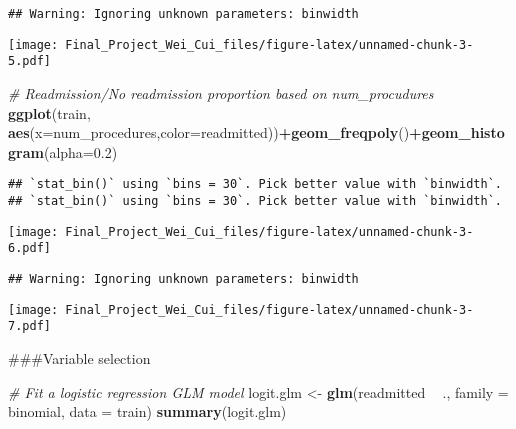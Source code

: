 \documentclass[
]{article}
\newenvironment{Shaded}{\begin{snugshade}}{\end{snugshade}}
\newcommand{\CommentTok}[1]{\textcolor[rgb]{0.56,0.35,0.01}{\textit{#1}}}
\newcommand{\DataTypeTok}[1]{\textcolor[rgb]{0.13,0.29,0.53}{#1}}
\newcommand{\DecValTok}[1]{\textcolor[rgb]{0.00,0.00,0.81}{#1}}
\newcommand{\FloatTok}[1]{\textcolor[rgb]{0.00,0.00,0.81}{#1}}
\newcommand{\KeywordTok}[1]{\textcolor[rgb]{0.13,0.29,0.53}{\textbf{#1}}}
\newcommand{\NormalTok}[1]{#1}
\newcommand{\OperatorTok}[1]{\textcolor[rgb]{0.81,0.36,0.00}{\textbf{#1}}}
\newcommand{\StringTok}[1]{\textcolor[rgb]{0.31,0.60,0.02}{#1}}
\begin{document}
\begin{verbatim}
## Warning: Ignoring unknown parameters: binwidth
\end{verbatim}

\texttt{[image: Final\_Project\_Wei\_Cui\_files/figure-latex/unnamed-chunk-3-5.pdf]}

\begin{Shaded}
\begin{Highlighting}[]
\CommentTok{# Readmission/No readmission proportion based on num_procudures}
\KeywordTok{ggplot}\NormalTok{(train, }\KeywordTok{aes}\NormalTok{(}\DataTypeTok{x=}\NormalTok{num_procedures,}\DataTypeTok{color=}\NormalTok{readmitted))}\OperatorTok{+}\KeywordTok{geom_freqpoly}\NormalTok{()}\OperatorTok{+}\KeywordTok{geom_histogram}\NormalTok{(}\DataTypeTok{alpha=}\FloatTok{0.2}\NormalTok{)}
\end{Highlighting}
\end{Shaded}

\begin{verbatim}
## `stat_bin()` using `bins = 30`. Pick better value with `binwidth`.
## `stat_bin()` using `bins = 30`. Pick better value with `binwidth`.
\end{verbatim}

\texttt{[image: Final\_Project\_Wei\_Cui\_files/figure-latex/unnamed-chunk-3-6.pdf]}

\begin{Shaded}
\end{Shaded}

\begin{verbatim}
## Warning: Ignoring unknown parameters: binwidth
\end{verbatim}

\texttt{[image: Final\_Project\_Wei\_Cui\_files/figure-latex/unnamed-chunk-3-7.pdf]}

\#\#\#Variable selection

\begin{Shaded}
\begin{Highlighting}[]
\CommentTok{# Fit a logistic regression GLM model}
\NormalTok{logit.glm <-}\StringTok{ }\KeywordTok{glm}\NormalTok{(readmitted }\OperatorTok{~}\StringTok{ }\NormalTok{., }\DataTypeTok{family =}\NormalTok{ binomial, }\DataTypeTok{data =}\NormalTok{ train)}
\KeywordTok{summary}\NormalTok{(logit.glm)}
\end{Highlighting}
\end{Shaded}
\end{document}
